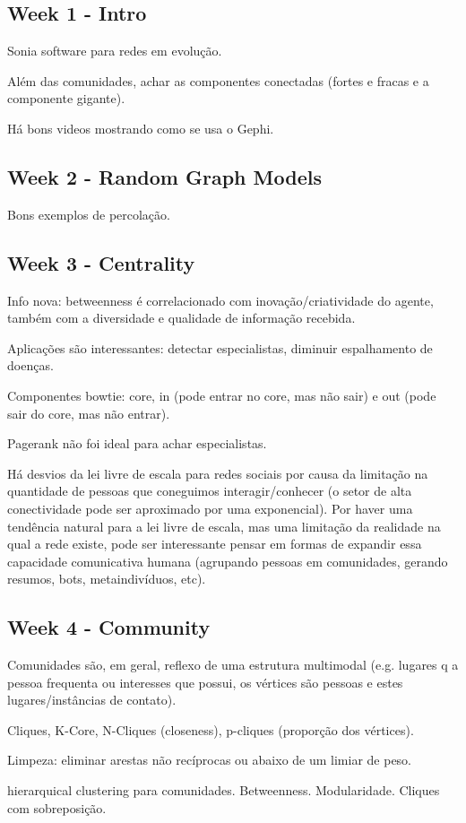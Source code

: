 \documentclass[12pt]{report}
\begin{document}
\subsection{Week 1 - Intro}
Sonia software para redes em evolução.

Além das comunidades, achar as componentes conectadas (fortes e fracas e a componente gigante).

Há bons videos mostrando como se usa o Gephi.
\subsection{Week 2 - Random Graph Models}
Bons exemplos de percolação.
\subsection{Week 3 - Centrality}
Info nova: betweenness é correlacionado com inovação/criatividade do agente, também com a diversidade e qualidade de informação recebida.

Aplicações são interessantes: detectar especialistas, diminuir espalhamento de doenças.

Componentes bowtie: core, in (pode entrar no core, mas não sair) e out (pode sair do core, mas não entrar).

Pagerank não foi ideal para achar especialistas.

Há desvios da lei livre de escala para redes sociais por causa da limitação na quantidade de pessoas que coneguimos interagir/conhecer (o setor de alta conectividade pode ser aproximado por uma exponencial). Por haver uma tendência natural para a lei livre de escala, mas uma limitação da realidade na qual a rede existe, pode ser interessante pensar em formas de expandir essa capacidade comunicativa humana (agrupando pessoas em comunidades, gerando resumos, bots, metaindivíduos, etc).
\subsection{Week 4 - Community}
Comunidades são, em geral, reflexo de uma estrutura multimodal (e.g. lugares q a pessoa frequenta ou interesses que possui, os vértices são pessoas e estes lugares/instâncias de contato).

Cliques, K-Core, N-Cliques (closeness), p-cliques (proporção dos vértices).

Limpeza: eliminar arestas não recíprocas ou abaixo de um limiar de peso.

hierarquical clustering para comunidades. Betweenness. Modularidade. Cliques com sobreposição.
\end{document}
